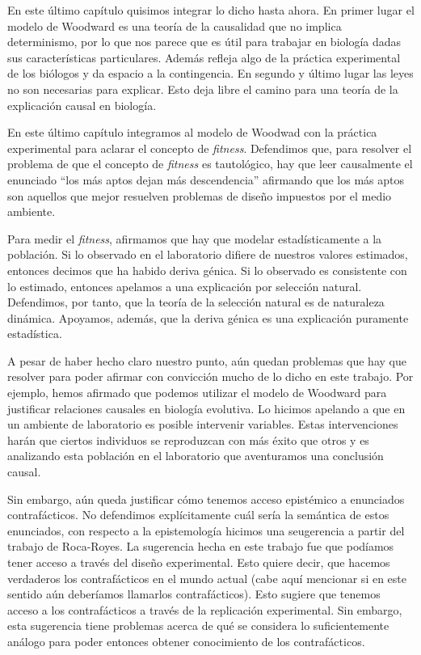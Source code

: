 En este último capítulo quisimos integrar lo dicho hasta ahora. En primer lugar el modelo de Woodward es una teoría de la causalidad que no implica determinismo, por lo que nos parece que es útil para trabajar en biología dadas sus características particulares. Además refleja algo de la práctica experimental de los biólogos y da espacio a la contingencia. En segundo y último lugar las leyes no son necesarias para explicar. Esto deja libre el camino para una teoría de la explicación causal en biología.

En este último capítulo integramos al modelo de Woodwad con la práctica experimental para aclarar el concepto de \emph{fitness}. Defendimos que, para resolver el problema de que el concepto de \emph{fitness} es tautológico, hay que leer causalmente el enunciado ``los más aptos dejan más descendencia'' afirmando que los más aptos son aquellos que mejor resuelven problemas de diseño impuestos por el medio ambiente.

Para medir el \emph{fitness}, afirmamos que hay que modelar estadísticamente a la población. Si lo observado en el laboratorio difiere de nuestros valores estimados, entonces decimos que ha habido deriva génica. Si lo observado es consistente con lo estimado, entonces apelamos a una explicación por selección natural. Defendimos, por tanto, que la teoría de la selección natural es de naturaleza dinámica. Apoyamos, además, que la deriva génica es una explicación puramente estadística.

A pesar de haber hecho claro nuestro punto, aún quedan problemas que hay que resolver para poder afirmar con convicción mucho de lo dicho en este trabajo. Por ejemplo, hemos afirmado que podemos utilizar el modelo de Woodward para justificar relaciones causales en biología evolutiva. Lo hicimos apelando a que en un ambiente de laboratorio es posible intervenir variables. Estas intervenciones harán que ciertos individuos se reproduzcan con más éxito que otros y es analizando esta población en el laboratorio que aventuramos una conclusión causal.

Sin embargo, aún queda justificar cómo tenemos acceso epistémico a enunciados contrafácticos. No defendimos explícitamente cuál sería la semántica de estos enunciados, con respecto a la epistemología hicimos una seugerencia a partir del trabajo de  Roca-Royes. La sugerencia hecha en este trabajo fue que podíamos tener acceso a través del diseño experimental. Esto quiere decir, que hacemos verdaderos los contrafácticos en el mundo actual (cabe aquí mencionar si en este sentido aún deberíamos llamarlos contrafácticos). Esto sugiere que tenemos acceso a los contrafácticos a través de la replicación experimental. Sin embargo, esta sugerencia tiene problemas acerca de qué se considera lo suficientemente análogo para poder entonces obtener conocimiento de los contrafácticos. 

